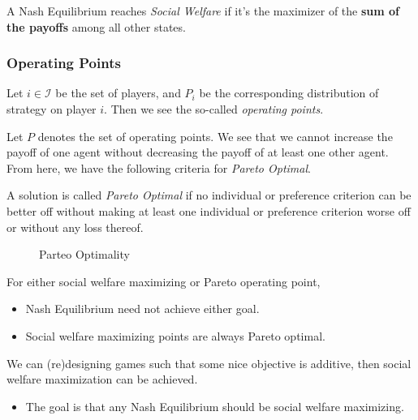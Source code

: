 \begin{definition}
	A Nash Equilibrium reaches \emph{Social Welfare} if it's the maximizer of the \textbf{sum of the payoffs} among all other states.
\end{definition}


\subsubsection{Operating Points}
Let \(i\in \mathcal{I} \) be the set of players, and \(P_{i}\) be the corresponding distribution of strategy on player \(i\). Then we see the
so-called \emph{operating points}.

\begin{figure}[H]
	\centering
	\label{fig:NE-social-welfare}
\end{figure}

Let \(P\) denotes the set of operating points. We see that we cannot increase the payoff of one agent without decreasing the payoff of at least
one other agent. From here, we have the following criteria for \emph{Pareto Optimal}.

\begin{definition}
	A solution is called \emph{Pareto Optimal} if no individual or preference criterion can be better off without making at least one
	individual or preference criterion worse off or without any loss thereof.
\end{definition}

\begin{figure}[H]
	\centering
	\caption{Parteo Optimality}
	\label{fig:Pareto-Optimal}
\end{figure}

\begin{note}
	For either social welfare maximizing or Pareto operating point,
	\begin{itemize}
		\item Nash Equilibrium need not achieve either goal.
		\item Social welfare maximizing points are always Pareto optimal.
	\end{itemize}
\end{note}

\begin{remark}
	We can (re)designing games such that some nice objective is additive, then social welfare maximization can be achieved.
	\begin{itemize}
		\item The goal is that any Nash Equilibrium should be social welfare maximizing.
	\end{itemize}
\end{remark}


